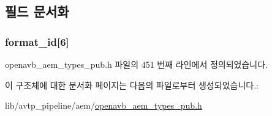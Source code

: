 \subsection{필드 문서화}
\subsubsection[{\texorpdfstring{format\+\_\+id}{format_id}}]{ format\+\_\+id\mbox{[}6\mbox{]}}\hypertarget{structopenavb__aem__stream__format__vendor__specific__t_ae1ff7c8bfecfa86c9ab47966bf21d53e}{}\label{structopenavb__aem__stream__format__vendor__specific__t_ae1ff7c8bfecfa86c9ab47966bf21d53e}


openavb\+\_\+aem\+\_\+types\+\_\+pub.\+h 파일의 451 번째 라인에서 정의되었습니다.



이 구조체에 대한 문서화 페이지는 다음의 파일로부터 생성되었습니다.\+:\begin{DoxyCompactItemize}
\item 
lib/avtp\+\_\+pipeline/aem/\hyperlink{openavb__aem__types__pub_8h}{openavb\+\_\+aem\+\_\+types\+\_\+pub.\+h}\end{DoxyCompactItemize}
